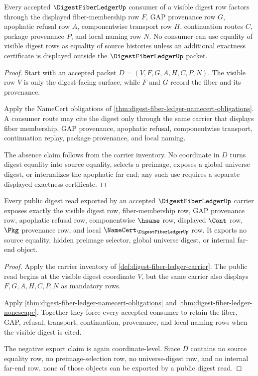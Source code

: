 \begin{theorem}
\label{thm:digest-fiber-ledger-nonescape}
Every accepted $\DigestFiberLedgerUp$ consumer of a visible digest row factors through the displayed fiber-membership row $F$, GAP provenance row $G$, apophatic refusal row $A$, componentwise transport row $H$, continuation routes $C$, package provenance $P$, and local naming row $N$. No consumer can use equality of visible digest rows as equality of source histories unless an additional exactness certificate is displayed outside the $\DigestFiberLedgerUp$ packet.
\end{theorem}
\begin{proof}
Start with an accepted packet $D=(V,F,G,A,H,C,P,N)$. The visible row $V$ is only the digest-facing surface, while $F$ and $G$ record the fiber and its provenance.

Apply the NameCert obligations of \autoref{thm:digest-fiber-ledger-namecert-obligations}. A consumer route may cite the digest only through the same carrier that displays fiber membership, GAP provenance, apophatic refusal, componentwise transport, continuation replay, package provenance, and local naming.

The absence claim follows from the carrier inventory. No coordinate in $D$ turns digest equality into source equality, selects a preimage, exposes a global universe digest, or internalizes the apophatic far end; any such use requires a separate displayed exactness certificate.
\end{proof}

\begin{theorem}
\label{thm:digest-fiber-ledger-public-export}
Every public digest read exported by an accepted $\DigestFiberLedgerUp$ carrier exposes exactly the visible digest row, fiber-membership row, GAP provenance row, apophatic refusal row, componentwise $\hsame$ row, displayed $\Cont$ row, $\Pkg$ provenance row, and local $\NameCert_{\DigestFiberLedgerUp}$ row. It exports no source equality, hidden preimage selector, global universe digest, or internal far-end object.
\end{theorem}
\begin{proof}
Apply the carrier inventory of \autoref{def:digest-fiber-ledger-carrier}. The public read begins at the visible digest coordinate $V$, but the same carrier also displays $F,G,A,H,C,P,N$ as mandatory rows.

Apply \autoref{thm:digest-fiber-ledger-namecert-obligations} and \autoref{thm:digest-fiber-ledger-nonescape}. Together they force every accepted consumer to retain the fiber, GAP, refusal, transport, continuation, provenance, and local naming rows when the visible digest is cited.

The negative export claim is again coordinate-level. Since $D$ contains no source equality row, no preimage-selection row, no universe-digest row, and no internal far-end row, none of those objects can be exported by a public digest read.
\end{proof}

